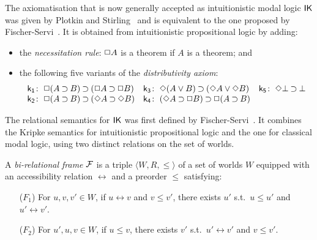 \documentclass[twoside]{aiml18}
\begin{document}
The axiomatisation that is now generally accepted as intuitionistic modal logic $\mathsf{IK}$ was given by Plotkin and Stirling~\cite{Plotkin} and is equivalent to the one proposed by Fischer-Servi~\cite{Fischer}.
%
It is obtained from intuitionistic propositional logic by adding:
\begin{itemize}
	\item the \emph{necessitation rule}: $\mathord{\Box} A$ is a theorem if $A$ is a theorem; and
	\item the following five variants of the \emph{distributivity axiom}:
	\begin{equation*}
	\label{eq:ik}%
	\begin{array}[t]{r@{\;}l@{\quad}r@{\;}l@{\quad}r@{\;}l}
	\kax[1]\colon&\BOX(A\IMP B)\IMP(\BOX A\IMP\BOX B)
	&
	\kax[3]\colon&\DIA(A\OR B)\IMP(\DIA A\OR\DIA B)
	&
	\kax[5]\colon&\DIA\BOT\IMP\BOT
	\\
	\kax[2]\colon&\BOX(A\IMP B)\IMP(\DIA A\IMP\DIA B)
	&
	\kax[4]\colon&(\DIA A\IMP \BOX B)\IMP\BOX(A\IMP B)\\%
	\end{array}
	\end{equation*}
\end{itemize}

The relational semantics for $\mathsf{IK}$ was first defined by Fischer-Servi~\cite{Fischer}.
%
It combines the Kripke semantics for intuitionistic propositional logic and the one for classical modal logic, using two distinct relations on the set of worlds.

\begin{definition}
	A \emph{bi-relational frame} $\mathcal{F}$ is a triple $\langle W, R, \le \rangle$ 
	of a set of worlds $W$ equipped with an {accessibility relation} $\rel$ and a preorder $\le$ satisfying:
	\begin{enumerate}
		\item[($F_1$)] For $u, v, v' \in W$, if $u \rel v$ and $v \le v'$, there exists $u'$ s.t.~$u \le u'$ and $u' \rel v'$.
		
		\item[($F_2$)] For $u', u, v \in W$, if $u \le v$, there exists $v'$ s.t.~$u' \rel v'$ and $v\le v'$.
	\end{enumerate}
\end{definition}
\end{document}
